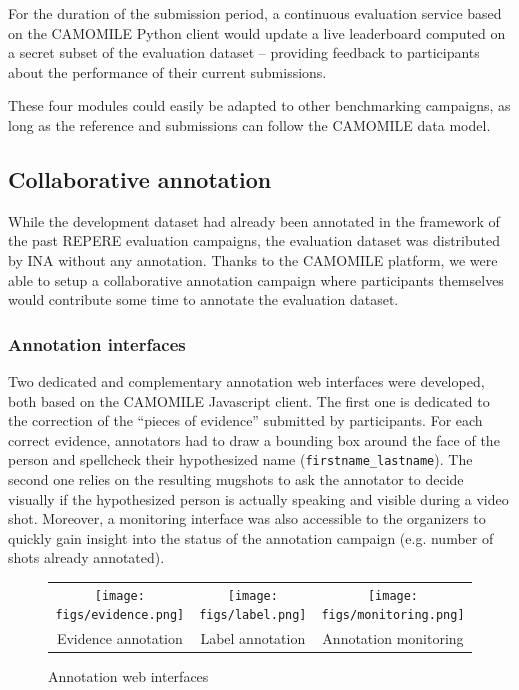\documentclass[10pt, a4paper]{article}
\begin{document}
For the duration of the submission period, a continuous
evaluation service based on the CAMOMILE Python client would update a live
leaderboard computed on a secret subset of the evaluation dataset -- providing
feedback to participants about the performance of their current submissions.

These four modules could easily be adapted to other benchmarking campaigns, as
long as the reference and submissions can follow the CAMOMILE data model.


\subsection{Collaborative annotation}

While the development dataset had already been annotated in the framework of
the past REPERE evaluation campaigns, the evaluation dataset was distributed by
INA without any annotation. Thanks to the CAMOMILE platform, we were able to
setup a collaborative annotation campaign where participants themselves would
contribute some time to annotate the evaluation dataset.

\subsubsection{Annotation interfaces}

Two dedicated and complementary annotation web interfaces were developed, both
based on the CAMOMILE Javascript client. The first one is dedicated to the
correction of the ``pieces of evidence'' submitted by participants. For each correct
evidence, annotators had to draw a bounding box around the face of the person
and spellcheck their hypothesized name (\texttt{firstname\_lastname}).
The second one relies on the resulting mugshots to ask the annotator to decide
visually if the hypothesized person is actually speaking and visible during a video shot.
Moreover, a monitoring interface was also accessible to the organizers to quickly gain insight into
the status of the annotation campaign (e.g. number of shots already annotated).

\begin{figure}[tb]
 \centering
 \begin{tabular}{ccc}
   \texttt{[image: figs/evidence.png]} &
   \texttt{[image: figs/label.png]} &
   \texttt{[image: figs/monitoring.png]} \\
   Evidence annotation & Label annotation & Annotation monitoring \\
 \end{tabular}
 \caption{Annotation web interfaces}
 \label{fig:annotation}
\end{figure}
\end{document}
